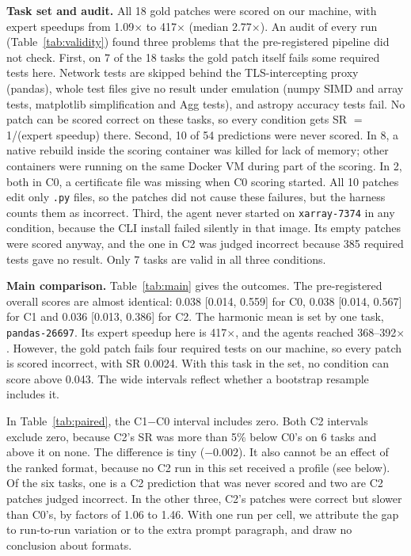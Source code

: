 \documentclass[conference]{IEEEtran}
\begin{document}
\textbf{Task set and audit.} All 18 gold patches were scored on our machine,
with expert speedups from 1.09$\times$ to 417$\times$ (median 2.77$\times$).
An audit of every run (Table~\ref{tab:validity}) found three problems that the
pre-registered pipeline did not check. First, on 7 of the 18 tasks the gold
patch itself fails some required tests here. Network tests are skipped
behind the TLS-intercepting proxy (pandas), whole test files give no result
under emulation (numpy SIMD and array tests, matplotlib simplification and
Agg tests), and astropy accuracy tests fail. No patch can be scored correct on
these tasks, so every condition gets SR $=$ 1/(expert speedup) there. Second,
10 of 54 predictions were never scored. In 8, a native rebuild inside the
scoring container was killed for lack of memory; other containers were
running on the same Docker VM during part of the scoring. In 2, both in C0, a
certificate file was missing when C0 scoring started. All 10 patches edit only
\texttt{.py} files, so the patches did not cause these failures, but the
harness counts them as incorrect. Third, the agent never started on
\texttt{xarray-7374} in any condition, because the CLI install failed silently
in that image. Its empty patches were scored anyway, and the one in C2 was
judged incorrect because 385 required tests gave no result. Only 7 tasks are
valid in all three conditions.

\textbf{Main comparison.} Table~\ref{tab:main} gives the outcomes. The
pre-registered overall scores are almost identical: 0.038 [0.014, 0.559] for
C0, 0.038 [0.014, 0.567] for C1 and 0.036 [0.013, 0.386] for C2. The harmonic
mean is set by one task, \texttt{pandas-26697}. Its expert speedup here is
417$\times$, and the agents reached 368--392$\times$. However, the gold patch
fails four required tests on our machine, so every patch is scored incorrect,
with SR 0.0024. With this task in the set, no condition can score above
0.043. The wide intervals reflect whether a bootstrap resample includes it.

In Table~\ref{tab:paired}, the C1$-$C0 interval includes zero. Both C2
intervals exclude zero, because C2's SR was more than 5\% below C0's on 6
tasks and above it on none. The difference is tiny ($-0.002$). It also cannot
be an effect of the ranked format, because no C2 run in this set received a
profile (see below). Of the six tasks, one is a C2 prediction that was never
scored and two are C2 patches judged incorrect. In the other three, C2's
patches were correct but slower than C0's, by factors of 1.06 to 1.46. With one
run per cell, we attribute the gap to run-to-run variation or to the extra
prompt paragraph, and draw no conclusion about formats.
\end{document}
